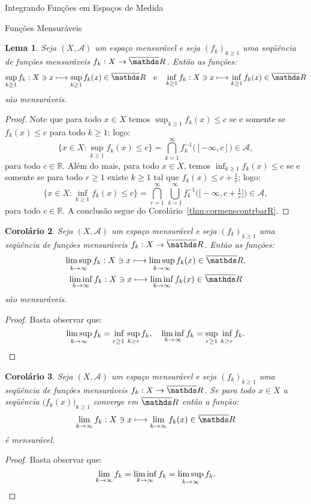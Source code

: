 \documentclass[oneside,final,11pt]{amsbook}
\newcommand{\R}{\mathds R}
\newcommand{\infsup}{\mathop{\vphantom{\sup}\inf}\limits}
\theoremstyle{remark}\newtheorem{exercise}{Exercício}[chapter]
\theoremstyle{remark}\newtheorem{*exercise}[exercise]{\hbox to 0pt{\hskip 0pt minus 1fil*}Exercício}
\theoremstyle{definition}\newtheorem{exdefin}{Definição}[chapter]
\theoremstyle{plain}\newtheorem{teo}{Teorema}[section]
\theoremstyle{plain}\newtheorem{lem}[teo]{Lema}
\theoremstyle{plain}\newtheorem{prop}[teo]{Proposição}
\theoremstyle{plain}\newtheorem{cor}[teo]{Corolário}
\theoremstyle{definition}\newtheorem{defin}[teo]{Definição}
\theoremstyle{remark}\newtheorem{rem}[teo]{Observação}
\theoremstyle{definition}\newtheorem{notation}[teo]{Notação}
\theoremstyle{definition}\newtheorem{convention}[teo]{Convenção}
\theoremstyle{definition}\newtheorem{example}[teo]{Exemplo}
\numberwithin{section}{chapter}
\numberwithin{equation}{section}
\begin{document}
\begin{chapter}{Integrando Funções em Espaços de Medida}
\begin{section}{Funções Mensuráveis}
\begin{lem}
Seja $(X,\mathcal A)$ um espaço mensurável e seja $(f_k)_{k\ge1}$ uma seqüência de funções
mensuráveis $f_k:X\to\overline\R$. Então as funções:
\[\sup_{k\ge1}f_k:X\ni x\longmapsto\sup_{k\ge1}f_k(x)\in\overline\R\quad\text{e}\quad
\inf_{k\ge1}f_k:X\ni x\longmapsto\inf_{k\ge1}f_k(x)\in\overline\R\]
são mensuráveis.
\end{lem}
\begin{proof}
Note que para todo $x\in X$ temos $\sup_{k\ge1}f_k(x)\le c$ se e somente se
$f_k(x)\le c$ para todo $k\ge1$; logo:
\[\Big\{x\in X:\sup_{k\ge1}f_k(x)\le c\Big\}=\bigcap_{k=1}^\infty f_k^{-1}\big([-\infty,c]\big)\in\mathcal A,\]
para todo $c\in\R$. Além do mais, para todo $x\in X$, temos $\inf_{k\ge1}f_k(x)\le c$
se e somente se para todo $r\ge1$ existe $k\ge1$ tal que $f_k(x)\le c+\frac1r$; logo:
\[\Big\{x\in X:\inf_{k\ge1}f_k(x)\le c\Big\}=\bigcap_{r=1}^\infty\,\bigcup_{k=1}^\infty f_k^{-1}\big(\big[-\infty,c+\tfrac1r\big]\big)\in\mathcal A,\]
para todo $c\in\R$. A conclusão segue do Corolário~\ref{thm:cormenscontrbarR}.
\end{proof}

\begin{cor}\label{thm:liminfsupmens}
Seja $(X,\mathcal A)$ um espaço mensurável e seja $(f_k)_{k\ge1}$ uma seqüência de funções
mensuráveis $f_k:X\to\overline\R$. Então as funções:
\begin{gather*}
\limsup_{k\to\infty}f_k:X\ni x\longmapsto\limsup_{k\to\infty}f_k(x)\in\overline\R,\\
\liminf_{k\to\infty}f_k:X\ni x\longmapsto\liminf_{k\to\infty}f_k(x)\in\overline\R
\end{gather*}
são mensuráveis.
\end{cor}
\begin{proof}
Basta observar que:
\[\limsup_{k\to\infty}f_k=\infsup_{r\ge1}\,\sup_{k\ge r}f_k,\quad
\liminf_{k\to\infty}f_k=\sup_{r\ge1}\,\infsup_{k\ge r}f_k.\qedhere\]
\end{proof}

\begin{cor}\label{thm:limmensmens}
Seja $(X,\mathcal A)$ um espaço mensurável e seja $(f_k)_{k\ge1}$ uma seqüência de funções
mensuráveis $f_k:X\to\overline\R$. Se para todo $x\in X$ a seqüência
$\big(f_k(x)\big)_{k\ge1}$ converge em $\overline\R$ então a função:
\[\lim_{k\to\infty}f_k:X\ni x\longmapsto\lim_{k\to\infty}f_k(x)\in\overline\R\]
é mensurável.
\end{cor}
\begin{proof}
Basta observar que:
\[\lim_{k\to\infty}f_k=\liminf_{k\to\infty}f_k=\limsup_{k\to\infty}f_k.\qedhere\]
\end{proof}


\end{section}
\end{chapter}
\end{document}
